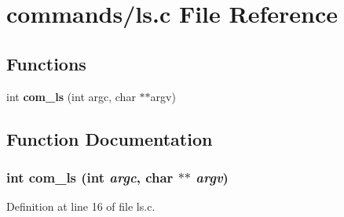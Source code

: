 \section{commands/ls.c File Reference}
\label{ls_8c}
\subsection*{Functions}
\begin{DoxyCompactItemize}
\item 
int {\bf com\_\-ls} (int argc, char $\ast$$\ast$argv)
\end{DoxyCompactItemize}


\subsection{Function Documentation}
\subsubsection[{com\_\-ls}]{\setlength{\rightskip}{0pt plus 5cm}int com\_\-ls (int {\em argc}, \/  char $\ast$$\ast$ {\em argv})}\label{ls_8c_a14ff7ba8097962befb0efe52bd36ebdd}


Definition at line 16 of file ls.c.


